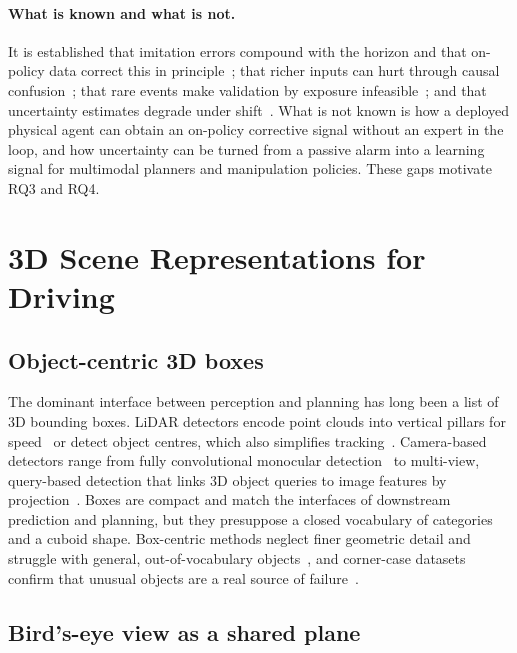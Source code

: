 \paragraph{What is known and what is not.} It is established that imitation errors compound with the horizon and that on-policy data correct this in principle~\cite{ross2010efficient,ross2011dagger}; that richer inputs can hurt through causal confusion~\cite{dehaan2019causal,codevilla2019exploring}; that rare events make validation by exposure infeasible~\cite{kalra2016driving,liu2024curse}; and that uncertainty estimates degrade under shift~\cite{ovadia2019can}. What is not known is how a deployed physical agent can obtain an on-policy corrective signal without an expert in the loop, and how uncertainty can be turned from a passive alarm into a learning signal for multimodal planners and manipulation policies. These gaps motivate RQ3 and RQ4.

\section{3D Scene Representations for Driving}\label{sec:bg:repr}

\subsection{Object-centric 3D boxes}

The dominant interface between perception and planning has long been a list of 3D bounding boxes. LiDAR detectors encode point clouds into vertical pillars for speed~\cite{lang2019pointpillars} or detect object centres, which also simplifies tracking~\cite{yin2021centerpoint}. Camera-based detectors range from fully convolutional monocular detection~\cite{wang2021fcos3d} to multi-view, query-based detection that links 3D object queries to image features by projection~\cite{wang2021detr3d}. Boxes are compact and match the interfaces of downstream prediction and planning, but they presuppose a closed vocabulary of categories and a cuboid shape. Box-centric methods neglect finer geometric detail and struggle with general, out-of-vocabulary objects~\cite{tian2023occ3d}, and corner-case datasets confirm that unusual objects are a real source of failure~\cite{li2022coda}.

\subsection{Bird's-eye view as a shared plane}

